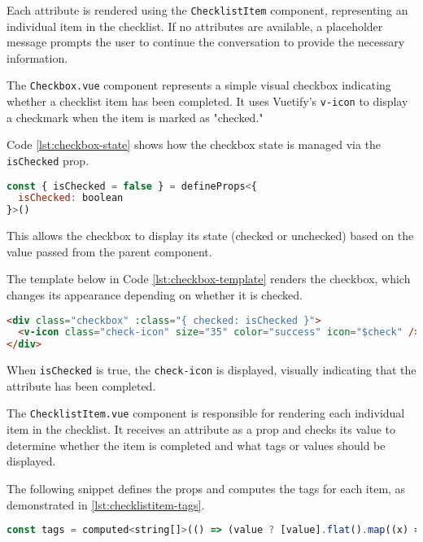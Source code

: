 Each attribute is rendered using the \texttt{ChecklistItem} component,
representing an individual item in the checklist. If no attributes
are available, a placeholder message prompts the user to continue the conversation to provide the necessary information.

The \texttt{Checkbox.vue} component represents a simple visual checkbox indicating
whether a checklist item has been completed. It uses Vuetify's \texttt{v-icon} to display a checkmark when the
item is marked as "checked."

Code \ref{lst:checkbox-state} shows how the checkbox state is managed via the \texttt{isChecked} prop.

\begin{lstlisting}[language=JavaScript, caption={Managing the Checkbox State (\texttt{Checkbox.vue})},
  firstnumber=2,label={lst:checkbox-state}]
const { isChecked = false } = defineProps<{
  isChecked: boolean
}>()
\end{lstlisting}

This allows the checkbox to display its state (checked or unchecked) based on the value passed from the parent
component.

The template below in Code \ref{lst:checkbox-template} renders the checkbox, which changes its appearance depending on
whether it is checked.

\begin{lstlisting}[language=HTML, caption={Rendering the Checkbox (\texttt{Checkbox.vue})},
  firstnumber=8,label={lst:checkbox-template}]
<div class="checkbox" :class="{ checked: isChecked }">
  <v-icon class="check-icon" size="35" color="success" icon="$check" />
</div>
\end{lstlisting}

When \texttt{isChecked} is true, the \texttt{check-icon} is displayed, visually indicating
that the attribute has been completed.

The \texttt{ChecklistItem.vue} component is responsible for rendering each individual item in
the checklist. It receives an attribute as a prop and checks its value to determine whether the item is completed
and what tags or values should be displayed.

The following snippet defines the props and computes the tags for each
item, as demonstrated in \ref{lst:checklistitem-tags}.

\begin{lstlisting}[language=JavaScript, caption={Computing Tags for Checklist Item (\texttt{ChecklistItem.vue})},
  firstnumber=16,label={lst:checklistitem-tags}]
const tags = computed<string[]>(() => (value ? [value].flat().map((x) => String(x)) : []))
\end{lstlisting}

